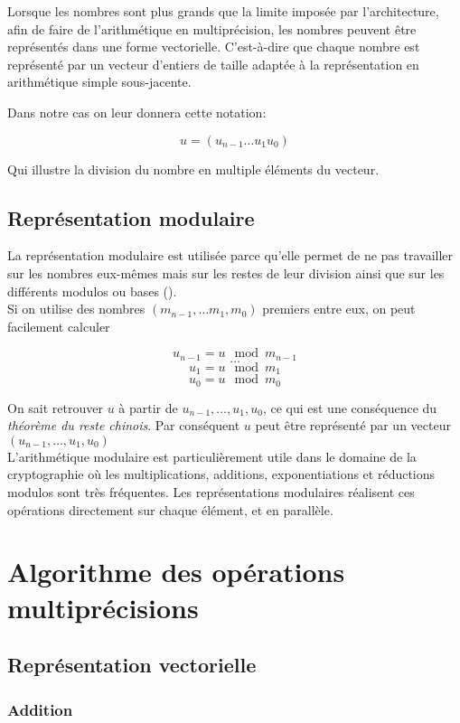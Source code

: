 \documentclass[letterpaper]{article}
\begin{document}
Lorsque les nombres sont plus grands que la limite imposée par l'architecture,
afin de faire de l'arithmétique en multiprécision, les nombres peuvent être
représentés dans une forme vectorielle. C'est-à-dire que chaque nombre est
représenté par un vecteur d'entiers de taille adaptée à la représentation
en arithmétique simple sous-jacente.

Dans notre cas on leur donnera cette notation:

  $$u = (u_{n-1} \dots u_1 u_0)$$

Qui illustre la division du nombre en multiple éléments du vecteur.

\subsection{Représentation modulaire}

La représentation modulaire est utilisée parce qu'elle permet de ne pas
travailler sur les nombres eux-mêmes mais sur les restes de leur division
ainsi que sur les différents modulos ou bases (\cite{wikiamodulaire}).\\

Si on utilise des nombres $(m_{n - 1}, \dots m_1, m_0)$ premiers entre eux,
on peut facilement calculer

  $$u_{n - 1} = u \mod m_{n - 1}$$
  $$\dots$$
  $$u_1 = u \mod m_1$$
  $$u_0 = u \mod m_0$$

On sait retrouver $u$ à partir de $u_{n - 1}, \dots, u_1, u_0$, ce qui
est une conséquence du \emph{théorème du reste chinois}. Par conséquent $u$
peut être représenté par un vecteur $(u_{n - 1}, \dots, u_{1}, u_{0})$\\

L'arithmétique modulaire est particulièrement utile dans le domaine de la
cryptographie où les multiplications, additions, exponentiations et réductions
modulos sont très fréquentes. Les représentations modulaires réalisent ces
opérations directement sur chaque élément, et en parallèle.

\section{Algorithme des opérations multiprécisions}

\subsection{Représentation vectorielle}

\subsubsection{Addition}
\end{document}
